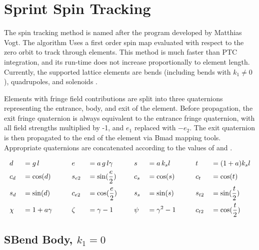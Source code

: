 \section{Sprint Spin Tracking}
\label{s:sprint.std}

The  spin tracking method is named after the  program developed by Matthias
Vogt.  The  algorithm Uses a first order spin map evaluated with respect to the zero
orbit to track through elements. This method is much faster than PTC integration, and its run-time
does not increase proportionally to element length. Currently, the supported lattice elements are
bends (including bends with $k_1 \neq 0$), quadrupoles, and solenoids .

Elements with fringe field contributions are split into three quaternions representing the entrance,
body, and exit of the element. Before propagation, the exit fringe quaternion is always equivalent
to the entrance fringe quaternion, with all field strengths multiplied by -1, and $e_1$ replaced
with $-e_2$. The exit quaternion is then propagated to the end of the element via Bmad mapping
tools. Appropriate quaternions are concatenated according to the values of  and
.

\begin{alignat}{8}
 & {d}    &&= g \, l              && {e}    &&= a \, g \, l\gamma   && s     &&= a \, k_s l       && {t}    &&= (1+a) k_s l         \nonumber \\
 & c_{d}  &&= \cos({d})    \qquad && s_{e2} &&= \sin(\frac{{e}}{2}) && c_{s} &&= \cos({s}) \qquad && c_{t}  &&= \cos({t})           \\
 & s_{d}  &&= \sin({d})           && c_{e2} &&= \cos(\frac{{e}}{2}) && s_{s} &&= \sin({s})        && s_{t2} &&= \sin(\frac{{t}}{2}) \nonumber \\
 & \chi   &&= 1+a\gamma           && \zeta  &&= \gamma - 1   \qquad && \psi  &&= \gamma^2 - 1     && c_{t2} &&= \cos(\frac{{t}}{2}) \nonumber
\end{alignat}

\subsection{SBend Body, $k_1 = 0$}

